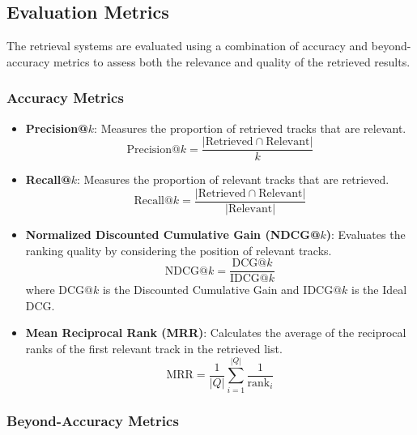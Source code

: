 \documentclass[sigconf]{acmart}
\begin{document}
\subsection{Evaluation Metrics}
\label{subsec:evaluation_metrics}

The retrieval systems are evaluated using a combination of accuracy and beyond-accuracy metrics to assess both the relevance and quality of the retrieved results.

\subsubsection{Accuracy Metrics}

\begin{itemize}
    \item \textbf{Precision@\( k \)}: Measures the proportion of retrieved tracks that are relevant.
    \[
    \text{Precision@}k = \frac{|\text{Retrieved} \cap \text{Relevant}|}{k}
    \]
    
    \item \textbf{Recall@\( k \)}: Measures the proportion of relevant tracks that are retrieved.
    \[
    \text{Recall@}k = \frac{|\text{Retrieved} \cap \text{Relevant}|}{|\text{Relevant}|}
    \]
    
    \item \textbf{Normalized Discounted Cumulative Gain (NDCG@\( k \))}: Evaluates the ranking quality by considering the position of relevant tracks.
    \[
    \text{NDCG@}k = \frac{\text{DCG@}k}{\text{IDCG@}k}
    \]
    where \( \text{DCG@}k \) is the Discounted Cumulative Gain and \( \text{IDCG@}k \) is the Ideal DCG.
    
    \item \textbf{Mean Reciprocal Rank (MRR)}: Calculates the average of the reciprocal ranks of the first relevant track in the retrieved list.
    \[
    \text{MRR} = \frac{1}{|Q|} \sum_{i=1}^{|Q|} \frac{1}{\text{rank}_i}
    \]
\end{itemize}

\subsubsection{Beyond-Accuracy Metrics}
\end{document}
